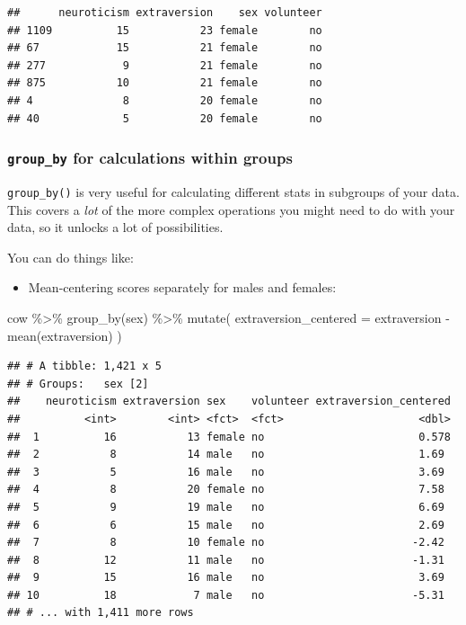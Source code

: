 \documentclass[
]{book}
\newenvironment{Shaded}{\begin{snugshade}}{\end{snugshade}}
\newcommand{\AttributeTok}[1]{\textcolor[rgb]{0.77,0.63,0.00}{#1}}
\newcommand{\FunctionTok}[1]{\textcolor[rgb]{0.00,0.00,0.00}{#1}}
\newcommand{\NormalTok}[1]{#1}
\newcommand{\SpecialCharTok}[1]{\textcolor[rgb]{0.00,0.00,0.00}{#1}}
\providecommand{\tightlist}{%
  \setlength{\itemsep}{0pt}\setlength{\parskip}{0pt}}
\begin{document}
\begin{verbatim}
##      neuroticism extraversion    sex volunteer
## 1109          15           23 female        no
## 67            15           21 female        no
## 277            9           21 female        no
## 875           10           21 female        no
## 4              8           20 female        no
## 40             5           20 female        no
\end{verbatim}

\hypertarget{group_by-for-calculations-within-groups}{%
\subsubsection*{\texorpdfstring{\texttt{group\_by} for calculations within groups}{group\_by for calculations within groups}}\label{group_by-for-calculations-within-groups}}

\texttt{group\_by()} is very useful for calculating different stats in
subgroups of your data. This covers a \emph{lot} of the more complex
operations you might need to do with your data, so it unlocks
a lot of possibilities.

You can do things like:

\begin{itemize}
\tightlist
\item
  Mean-centering scores separately for males and females:
\end{itemize}

\begin{Shaded}
\begin{Highlighting}[]
\NormalTok{cow }\SpecialCharTok{\%\textgreater{}\%}
    \FunctionTok{group\_by}\NormalTok{(sex) }\SpecialCharTok{\%\textgreater{}\%}
    \FunctionTok{mutate}\NormalTok{(}
        \AttributeTok{extraversion\_centered =}\NormalTok{ extraversion }\SpecialCharTok{{-}} \FunctionTok{mean}\NormalTok{(extraversion)}
\NormalTok{    )}
\end{Highlighting}
\end{Shaded}

\begin{verbatim}
## # A tibble: 1,421 x 5
## # Groups:   sex [2]
##    neuroticism extraversion sex    volunteer extraversion_centered
##          <int>        <int> <fct>  <fct>                     <dbl>
##  1          16           13 female no                        0.578
##  2           8           14 male   no                        1.69 
##  3           5           16 male   no                        3.69 
##  4           8           20 female no                        7.58 
##  5           9           19 male   no                        6.69 
##  6           6           15 male   no                        2.69 
##  7           8           10 female no                       -2.42 
##  8          12           11 male   no                       -1.31 
##  9          15           16 male   no                        3.69 
## 10          18            7 male   no                       -5.31 
## # ... with 1,411 more rows
\end{verbatim}
\end{document}
